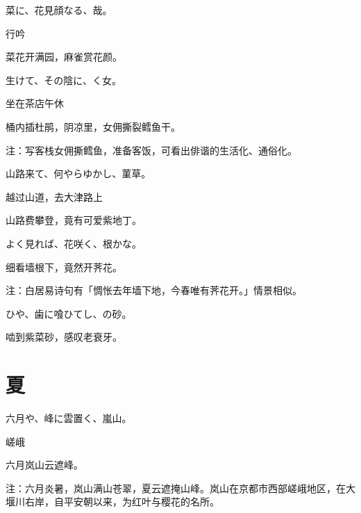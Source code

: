 \begin{haiku}
    {\FH 菜に、花見顔なる、哉。}

    {\FK 行吟}

    {\FK 菜花开满园，麻雀赏花颜。}
\end{haiku}

\begin{haiku}
    {\FH {}生けて、その陰に、く女。}

    {\FK 坐在茶店午休}

    {\FK 桶内插杜鹃，阴凉里，女佣撕裂鳕鱼干。}

    {\FT 注：写客栈女佣撕鳕鱼，准备客饭，可看出俳谐的生活化、通俗化。}
\end{haiku}

\begin{haiku}
    {\FH 山路来て、何やらゆかし、菫草。}

    {\FK 越过山道，去大津路上}

    {\FK 山路费攀登，竟有可爱紫地丁。}
\end{haiku}

\begin{haiku}
    {\FH よく見れば、花咲く、根かな。}

    {\FK 细看墙根下，竟然开荠花。}

    {\FT 注：白居易诗句有「惆怅去年墙下地，今春唯有荠花开。」情景相似。}
\end{haiku}

\begin{haiku}
    {\FH {}ひや、歯に喰ひてし、の砂。}

    {\FK 啮到紫菜砂，感叹老衰牙。}
\end{haiku}

\section{\FK 夏}

\setcounter{haikucounter}{0}

\begin{haiku}
    {\FH 六月や、峰に雲置く、嵐山。}

    {\FK 嵯峨}

    {\FK 六月岚山云遮峰。}

    {\FT 注：六月炎暑，岚山满山苍翠，夏云遮掩山峰。岚山在京都市西部嵯峨地区，在大堰川右岸，自平安朝以来，为红叶与樱花的名所。}
\end{haiku}

